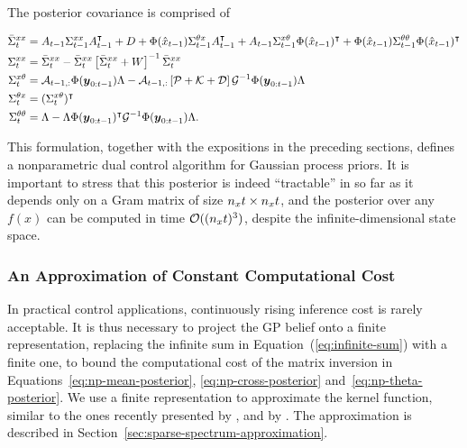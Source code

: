\pagebreak[4]

The posterior covariance is comprised of
\begin{fullwidth}\vspace{-\baselineskip}
\begin{subequations}
\begin{align}
  \bar \Sigma_\tk ^{xx} &= A_{\tk-1} \Sigma_{\tk-1}^{xx} A_{\tk-1}\T + \DC +
  \Phi(\hat x_{\tk-1}) \Sigma^{\t x}_{\tk-1} A_{\tk-1}\T + A_{\tk-1}
  \Sigma^{x\t}_{\tk-1} \Phi(\hat x_{\tk-1})\T +   \Phi(\hat x_{\tk-1})
  \Sigma^{\t\t}_{\tk-1}\Phi(\hat x_{\tk-1})\T \\
  \Sigma_\tk^{xx} &= \bar\Sigma_{\tk} ^{xx} - \bar\Sigma_{\tk} ^{xx}
  \left[ \bar\Sigma_{\tk} ^{xx} + \NC \right]\inv \bar\Sigma_{\tk} ^{xx}\\
  \Sigma_\tk ^{x\theta} &= \cF_{\tk-1,:}\Phi(\vec{y}_{0:\tk-1})\Lambda
   - \cF_{\tk-1,:} \left[ \cP + \cK + \cQ \right] \cG\inv
  \Phi(\vec{y}_{0:\tk-1})  \Lambda
   \label{eq:np-cross-posterior}\\
  \Sigma_\tk ^{\theta x} &= (\Sigma_\tk ^{x\theta})\T\\
  \Sigma_\tk ^{\t\t} &= \Lambda
  - \Lambda \Phi(\vec{y}_{0:\tk-1})\T \cG\inv \Phi(\vec{y}_{0:\tk-1}) \Lambda.
\label{eq:np-theta-posterior}
\end{align}
\end{subequations}
\end{fullwidth}

This formulation, together with the expositions in the preceding
sections, defines a nonparametric dual control algorithm for Gaussian
process priors. It is important to stress that this posterior is indeed
``tractable'' in so far as it depends only on a Gram matrix of size ${n_x} t\times
{n_x} t$, and the posterior over any $f(x)$ can be computed in time
$\mathcal{O}(({n_x} t)^3)$,
despite the infinite-dimensional state space.

\subsubsection{An Approximation of Constant Computational Cost}
\label{sec:an-approximation-of-constant-cost}

In practical control applications, continuously rising inference
cost is rarely acceptable. It is thus necessary to project the GP belief
onto a finite representation, replacing the infinite sum in
Equation~(\ref{eq:infinite-sum}) with a finite one, to bound the computational
cost of the matrix inversion in Equations~\eqref{eq:np-mean-posterior},
\eqref{eq:np-cross-posterior} and~\eqref{eq:np-theta-posterior}.
We use a finite representation to approximate the kernel function, similar to
the ones recently presented by \textcite{Rahimi.Recht:2008:Random}, and by
\textcite{Lazaro.ea:2010:Sparse}. The approximation is described in
Section~\ref{sec:sparse-spectrum-approximation}.

